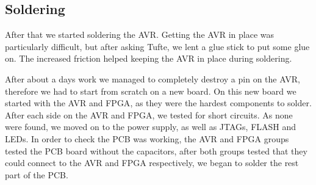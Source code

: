 \subsection{Soldering}
After that we started soldering the AVR. Getting the AVR in place was particularly difficult,
but after asking Tufte, we lent a glue stick to put some glue on. The increased friction helped keeping the AVR in place during soldering.

After about a days work we managed to completely destroy a pin on the AVR,
therefore we had to start from scratch on a new board. On this new board we
started with the AVR and \ac{FPGA}, as they were the hardest components to
solder. After each side on the AVR and \ac{FPGA}, we tested for short
circuits. As none were found, we moved on to the power supply, as well as
\acp{JTAG}, FLASH and \acp{LED}. In order to check the \ac{PCB} was working, the
AVR and \ac{FPGA} groups tested the \ac{PCB} board without the capacitors, after
both groups tested that they could connect to the AVR and \ac{FPGA}
respectively, we began to solder the rest part of the \ac{PCB}.

